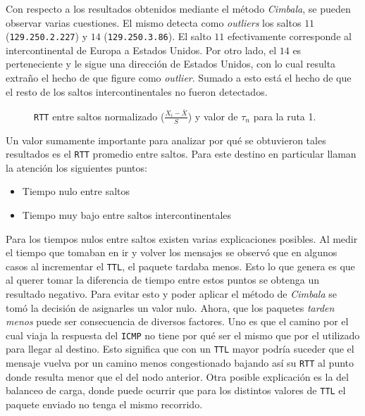 Con respecto a los resultados obtenidos mediante el método \emph{Cimbala}, se
pueden observar varias cuestiones. El mismo detecta como \emph{outliers} los
saltos $11$ (\texttt{129.250.2.227}) y $14$ (\texttt{129.250.3.86}). El salto
$11$ efectivamente corresponde al intercontinental de Europa a Estados Unidos.
Por otro lado, el $14$ es perteneciente y le sigue una dirección de Estados Unidos,
con lo cual resulta extraño el hecho de que figure como \emph{outlier}. Sumado a
esto está el hecho de que el resto de los saltos intercontinentales no fueron
detectados.

\begin{figure}[H]
    \caption{\texttt{RTT} entre saltos normalizado ($\frac{X_i-\bar{X}}{S}$)
    y valor de $\tau_n$ para la ruta 1.}
    \label{res:esc1:rtt}
\end{figure}

Un valor sumamente importante para analizar por qué se obtuvieron tales
resultados es el \texttt{RTT} promedio entre saltos. Para este destino en
particular llaman la atención los siguientes puntos:

\begin{itemize}
    \item Tiempo nulo entre saltos
    \item Tiempo muy bajo entre saltos intercontinentales
\end{itemize}

Para los tiempos nulos entre saltos existen varias explicaciones posibles. Al
medir el tiempo que tomaban en ir y volver los mensajes se observó que en
algunos casos al incrementar el \texttt{TTL}, el paquete tardaba menos. Esto lo
que genera es que al querer tomar la diferencia de tiempo entre estos puntos se
obtenga un resultado negativo. Para evitar esto y poder aplicar el método de
\emph{Cimbala} se tomó la decisión de asignarles un valor nulo. Ahora, que los
paquetes \emph{tarden menos} puede ser consecuencia de diversos factores. Uno es
que el camino por el cual viaja la respuesta del \texttt{ICMP} no tiene por qué
ser el mismo que por el utilizado para llegar al destino.  Esto significa que con un
\texttt{TTL} mayor podría suceder que el mensaje vuelva por un camino menos
congestionado bajando así su \texttt{RTT} al punto donde resulta menor que el
del nodo anterior. Otra posible explicación es la del balanceo de carga, donde
puede ocurrir que para los distintos valores de \texttt{TTL} el paquete enviado
no tenga el mismo recorrido.

